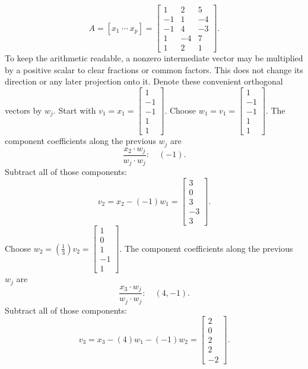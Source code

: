 \[A=[x_1\ \cdots\ x_p]=\left[\begin{array}{rrr}1&2&5\\-1&1&-4\\-1&4&-3\\1&-4&7\\1&2&1\end{array}\right].\]
To keep the arithmetic readable, a nonzero intermediate vector may be multiplied by a positive scalar to clear fractions or common factors. This does not change its direction or any later projection onto it. Denote these convenient orthogonal vectors by $w_j$.
Start with $v_1=x_1=\left[\begin{array}{r}1\\-1\\-1\\1\\1\end{array}\right]$.
Choose $w_{1}=v_{1}=\left[\begin{array}{r}1\\-1\\-1\\1\\1\end{array}\right]$.
The component coefficients along the previous $w_j$ are
\[\frac{x_{2}\cdot w_j}{w_j\cdot w_j}:\quad(-1).\]
Subtract all of those components:
\[v_{2}=x_{2}-(-1)w_{1}=\left[\begin{array}{r}3\\0\\3\\-3\\3\end{array}\right].\]
Choose $w_{2}=(\frac{1}{3})v_{2}=\left[\begin{array}{r}1\\0\\1\\-1\\1\end{array}\right]$.
The component coefficients along the previous $w_j$ are
\[\frac{x_{3}\cdot w_j}{w_j\cdot w_j}:\quad(4,-1).\]
Subtract all of those components:
\[v_{3}=x_{3}-(4)w_{1}-(-1)w_{2}=\left[\begin{array}{r}2\\0\\2\\2\\-2\end{array}\right].\]
